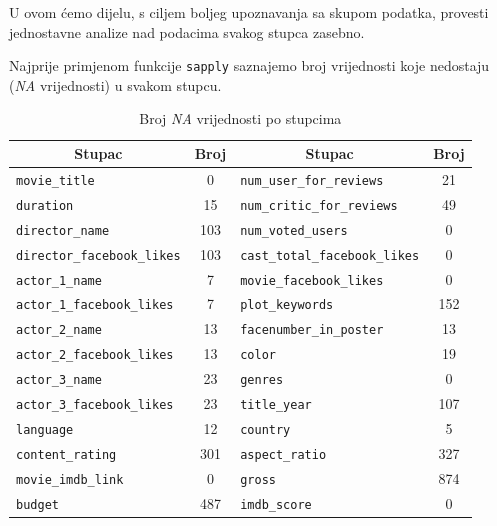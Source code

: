 	 U ovom ćemo dijelu, s ciljem boljeg upoznavanja sa skupom podatka, provesti jednostavne analize nad podacima svakog stupca zasebno. 
	 
	 Najprije primjenom funkcije \texttt{sapply} saznajemo broj vrijednosti koje nedostaju (\textit{NA} vrijednosti) u svakom stupcu.
	 
	 \begin{table}[H]
	 	\centering
	 	\renewcommand{\arraystretch}{1.5} %
	 	\begin{tabular}{|l|c|l|c|}
	 		\hline
	 		\multicolumn{1}{|c|}{\textbf{Stupac}} & \multicolumn{1}{c|}{\textbf{Broj}} & \multicolumn{1}{c|}{\textbf{Stupac}} & \multicolumn{1}{c|}{\textbf{Broj}} \\
	 		\hline
	 		\texttt{movie\_title} & 0 & \texttt{num\_user\_for\_reviews} & 21 \\
	 		\hline
	 		\texttt{duration} & 15 & \texttt{num\_critic\_for\_reviews} & 49 \\
	 		\hline
	 		\texttt{director\_name} & 103 & \texttt{num\_voted\_users} & 0 \\
	 		\hline
	 		\texttt{director\_facebook\_likes} & 103 & \texttt{cast\_total\_facebook\_likes} & 0 \\
	 		\hline
	 		\texttt{actor\_1\_name} & 7 & \texttt{movie\_facebook\_likes} & 0 \\
	 		\hline
	 		\texttt{actor\_1\_facebook\_likes} & 7 & \texttt{plot\_keywords} & 152 \\
	 		\hline
	 		\texttt{actor\_2\_name} & 13 & \texttt{facenumber\_in\_poster} & 13 \\
	 		\hline
	 		\texttt{actor\_2\_facebook\_likes} & 13 & \texttt{color} & 19 \\
	 		\hline
	 		\texttt{actor\_3\_name} & 23 & \texttt{genres} & 0 \\
	 		\hline
	 		\texttt{actor\_3\_facebook\_likes} & 23 & \texttt{title\_year} & 107 \\
	 		\hline
	 		\texttt{language} & 12 & \texttt{country} & 5 \\
	 		\hline
	 		\texttt{content\_rating} & 301 & \texttt{aspect\_ratio} & 327 \\
	 		\hline
	 		\texttt{movie\_imdb\_link} & 0 & \texttt{gross} & 874 \\
	 		\hline
	 		\texttt{budget} & 487 & \texttt{imdb\_score} & 0 \\
	 		\hline
	 	\end{tabular}
	 	\caption{Broj \textit{NA} vrijednosti po stupcima}
	 	\label{na}
	 \end{table}
	 
